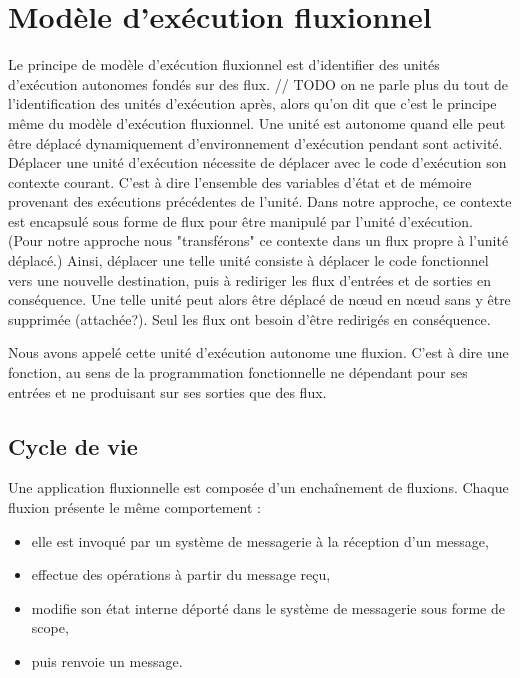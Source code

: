 \section{Modèle d'exécution fluxionnel}

	Le principe de modèle d'exécution fluxionnel est d'identifier des unités d'exécution autonomes fondés sur des flux.
	// TODO on ne parle plus du tout de l'identification des unités d'exécution après, alors qu'on dit que c'est le principe même du modèle d'exécution fluxionnel.
	Une unité est autonome quand elle peut être déplacé dynamiquement d'environnement d'exécution pendant sont activité.
	Déplacer une unité d'exécution nécessite de déplacer avec le code d'exécution son contexte courant. C'est à dire l'ensemble des variables d'état et de mémoire provenant des exécutions précédentes de l'unité.
	Dans notre approche, ce contexte est encapsulé sous forme de flux pour être manipulé par l'unité d'exécution.
	(Pour notre approche nous "transférons" ce contexte dans un flux propre à l'unité déplacé.)
	Ainsi, déplacer une telle unité consiste à déplacer le code fonctionnel vers une nouvelle destination, puis à rediriger les flux d'entrées et de sorties en conséquence. Une telle unité peut alors être déplacé de nœud en nœud sans y être supprimée (attachée?).
	Seul les flux ont besoin d'être redirigés en conséquence.

	Nous avons appelé cette unité d'exécution autonome une fluxion. C'est à dire une fonction, au sens de la programmation fonctionnelle ne dépendant pour ses entrées et ne produisant sur ses sorties que des flux.

	\subsection{Cycle de vie}

		Une application fluxionnelle est composée d'un enchaînement de fluxions.
		Chaque fluxion présente le même comportement : 
		\begin{itemize}
			\item elle est invoqué par un système de messagerie à la réception d'un message,
			\item effectue des opérations à partir du message reçu,
			\item modifie son état interne déporté dans le système de messagerie sous forme de scope,
			\item  puis renvoie un message.
		\end{itemize}

